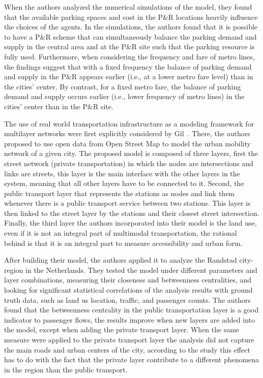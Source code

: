 When the authors analyzed the numerical simulations of the model, they found that the available parking spaces and cost in the P\&R locations heavily influence the choices of the agents. In the simulations, the authors found that it is possible to have a P\&R scheme that can simultaneously balance the parking demand and supply in the central area and at the P\&R site such that the parking resource is fully used. Furthermore, when considering the frequency and fare of metro lines, the findings suggest that with a fixed frequency the balance of parking demand and supply in the P\&R appears earlier (i.e., at a lower metro fare level) than in the cities' center. By contrast, for a fixed metro fare, the balance of parking demand and supply occurs earlier (i.e., lower frequency of metro lines) in the cities' center than in the P\&R site. 

The use of real world transportation infrastructure as a modeling framework for multilayer networks were first explicitly considered  by Gil~\cite{gil2014configuration}. There, the authors proposed to use open data from Open Street Map to model the urban mobility network of a given city. The proposed model is composed of three layers, first the street network (private transportation) in which the nodes are intersections and links are streets, this layer is the main interface with the other layers in the system, meaning that all other layers have to be connected to it. Second, the public transport layer that represents the stations as nodes and link them whenever there is a public transport service between two stations. This layer is then linked to the street layer by the stations and their closest street intersection. Finally, the third layer the authors incorporated into their model is the land use, even if it is not an integral part of multimodal transportation, the rational behind is that it is an integral part to measure accessibility and urban form.

After building their model, the authors applied it to analyze the Randstad city-region in the Netherlands. They tested the model under different parameters and layer combinations, measuring their closeness and betweenness centralities, and looking for significant statistical correlations of the analysis results with ground truth data, such as land us location, traffic, and passenger counts. The authors found that the betweenness centrality in the public transportation layer is a good indicator to passenger flows, the results improve when new layers are added into the model, except when adding the private transport layer. When the same measure were applied to the private transport layer the analysis did not capture the main roads and urban centers of the city, according to the study this effect has to do with the fact that the private layer contribute to a different phenomena in the region than the public transport.


